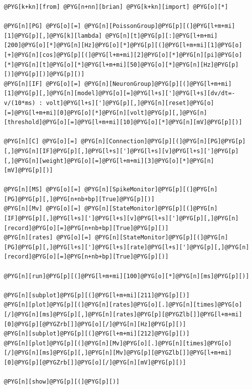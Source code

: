\documentclass[letterpaper,10pt,english]{manual}
\begin{document}
\begin{Verbatim}[commandchars=@\[\]]
@PYG[k+kn][from] @PYG[n+nn][brian] @PYG[k+kn][import] @PYG[o][*]

@PYG[n][PG] @PYG[o][=] @PYG[n][PoissonGroup]@PYG[p][(]@PYG[l+m+mi][1]@PYG[p][,]@PYG[k][lambda] @PYG[n][t]@PYG[p][:]@PYG[l+m+mi][200]@PYG[o][*]@PYG[n][Hz]@PYG[o][*]@PYG[p][(]@PYG[l+m+mi][1]@PYG[o][+]@PYG[n][cos]@PYG[p][(]@PYG[l+m+mi][2]@PYG[o][*]@PYG[n][pi]@PYG[o][*]@PYG[n][t]@PYG[o][*]@PYG[l+m+mi][50]@PYG[o][*]@PYG[n][Hz]@PYG[p][)]@PYG[p][)]@PYG[p][)]
@PYG[n][IF] @PYG[o][=] @PYG[n][NeuronGroup]@PYG[p][(]@PYG[l+m+mi][1]@PYG[p][,]@PYG[n][model]@PYG[o][=]@PYG[l+s][']@PYG[l+s][dv/dt=-v/(10*ms) : volt]@PYG[l+s][']@PYG[p][,]@PYG[n][reset]@PYG[o][=]@PYG[l+m+mi][0]@PYG[o][*]@PYG[n][volt]@PYG[p][,]@PYG[n][threshold]@PYG[o][=]@PYG[l+m+mi][10]@PYG[o][*]@PYG[n][mV]@PYG[p][)]

@PYG[n][C] @PYG[o][=] @PYG[n][Connection]@PYG[p][(]@PYG[n][PG]@PYG[p][,]@PYG[n][IF]@PYG[p][,]@PYG[l+s][']@PYG[l+s][v]@PYG[l+s][']@PYG[p][,]@PYG[n][weight]@PYG[o][=]@PYG[l+m+mi][3]@PYG[o][*]@PYG[n][mV]@PYG[p][)]

@PYG[n][MS] @PYG[o][=] @PYG[n][SpikeMonitor]@PYG[p][(]@PYG[n][PG]@PYG[p][,]@PYG[n+nb+bp][True]@PYG[p][)]
@PYG[n][Mv] @PYG[o][=] @PYG[n][StateMonitor]@PYG[p][(]@PYG[n][IF]@PYG[p][,]@PYG[l+s][']@PYG[l+s][v]@PYG[l+s][']@PYG[p][,]@PYG[n][record]@PYG[o][=]@PYG[n+nb+bp][True]@PYG[p][)]
@PYG[n][rates] @PYG[o][=] @PYG[n][StateMonitor]@PYG[p][(]@PYG[n][PG]@PYG[p][,]@PYG[l+s][']@PYG[l+s][rate]@PYG[l+s][']@PYG[p][,]@PYG[n][record]@PYG[o][=]@PYG[n+nb+bp][True]@PYG[p][)]

@PYG[n][run]@PYG[p][(]@PYG[l+m+mi][100]@PYG[o][*]@PYG[n][ms]@PYG[p][)]

@PYG[n][subplot]@PYG[p][(]@PYG[l+m+mi][211]@PYG[p][)]
@PYG[n][plot]@PYG[p][(]@PYG[n][rates]@PYG[o][.]@PYG[n][times]@PYG[o][/]@PYG[n][ms]@PYG[p][,]@PYG[n][rates]@PYG[p][@PYGZlb[]]@PYG[l+m+mi][0]@PYG[p][@PYGZrb[]]@PYG[o][/]@PYG[n][Hz]@PYG[p][)]
@PYG[n][subplot]@PYG[p][(]@PYG[l+m+mi][212]@PYG[p][)]
@PYG[n][plot]@PYG[p][(]@PYG[n][Mv]@PYG[o][.]@PYG[n][times]@PYG[o][/]@PYG[n][ms]@PYG[p][,]@PYG[n][Mv]@PYG[p][@PYGZlb[]]@PYG[l+m+mi][0]@PYG[p][@PYGZrb[]]@PYG[o][/]@PYG[n][mV]@PYG[p][)]

@PYG[n][show]@PYG[p][(]@PYG[p][)]
\end{Verbatim}

\resetcurrentobjects
\hypertarget{--doc-examples-misc_pulsepacket}{}
\end{document}

